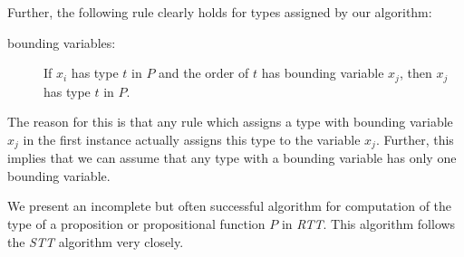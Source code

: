\documentclass{article}
\begin{document}
Further, the following rule clearly holds for types assigned by our algorithm:

\begin{description}

\item[bounding variables:] If $x_i$ has type $t$ in $P$ and the order
of $t$ has bounding variable $x_j$, then $x_j$ has type $t$ in $P$.

\end{description}

The reason for this is that any rule which assigns a type with
bounding variable $x_j$ in the first instance actually assigns this
type to the variable $x_j$.  Further, this implies that we can assume
that any type with a bounding variable has only one bounding variable.

We present an incomplete but often successful algorithm for
computation of the type of a proposition or propositional function $P$
in {\em RTT\/}.  This algorithm follows the {\em STT\/} algorithm very
closely.
\end{document}
